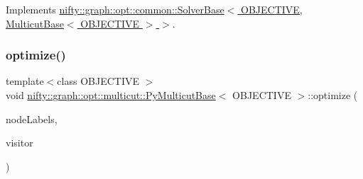 Implements \hyperlink{classnifty_1_1graph_1_1opt_1_1common_1_1SolverBase_a55e9eb645c07d6e0782ebfb990ab3c84}{nifty\+::graph\+::opt\+::common\+::\+Solver\+Base$<$ O\+B\+J\+E\+C\+T\+I\+V\+E, Multicut\+Base$<$ O\+B\+J\+E\+C\+T\+I\+V\+E $>$ $>$}.

\mbox{\label{classnifty_1_1graph_1_1opt_1_1multicut_1_1PyMulticutBase_a1d937be26c587bd510f434415caa8314}} 
\subsubsection{\texorpdfstring{optimize()}{optimize()}\hspace{0.1cm}{\footnotesize\ttfamily [1/2]}}
{\footnotesize\ttfamily template$<$class O\+B\+J\+E\+C\+T\+I\+VE $>$ \\
void \hyperlink{classnifty_1_1graph_1_1opt_1_1multicut_1_1PyMulticutBase}{nifty\+::graph\+::opt\+::multicut\+::\+Py\+Multicut\+Base}$<$ O\+B\+J\+E\+C\+T\+I\+VE $>$\+::optimize (\begin{DoxyParamCaption}\item[{\hyperlink{classnifty_1_1graph_1_1opt_1_1multicut_1_1PyMulticutBase_a34b9d7a58d056154c6b1abe7a83297c6}{Node\+Labels\+Type} \&}]{node\+Labels,  }\item[{\hyperlink{classnifty_1_1graph_1_1opt_1_1multicut_1_1PyMulticutBase_ac1d714affe7c2138ec75b9faad3000f6}{Visitor\+Base\+Type} $\ast$}]{visitor }\end{DoxyParamCaption})\hspace{0.3cm}{\ttfamily [inline]}}

\mbox{\label{classnifty_1_1graph_1_1opt_1_1multicut_1_1PyMulticutBase_a1d937be26c587bd510f434415caa8314}} 
